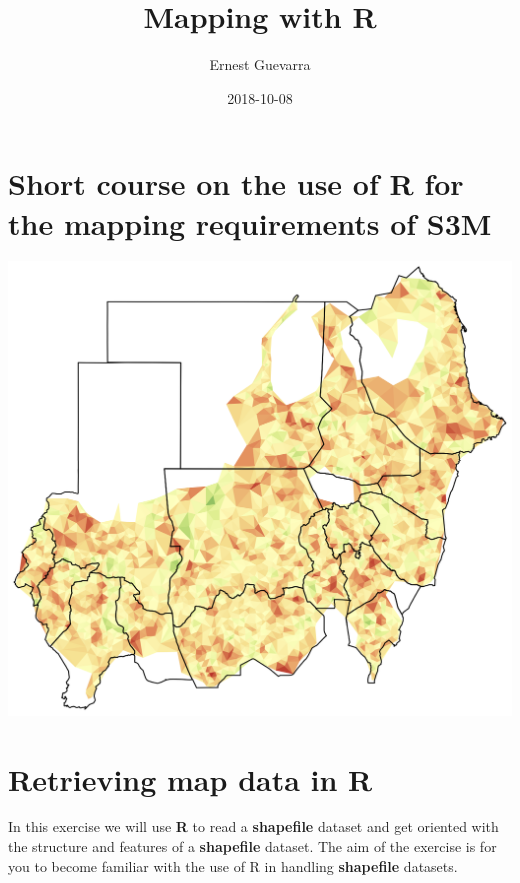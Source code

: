 \documentclass[12pt,a4paper,a4paper]{book}
\title{Mapping with R}
\author{Ernest Guevarra}
\date{2018-10-08}
\theoremstyle{definition}
\theoremstyle{definition}
\theoremstyle{definition}
\theoremstyle{remark}
\begin{document}
\maketitle

{
\hypersetup{linkcolor=black}
\setcounter{tocdepth}{1}
\tableofcontents
}
\listoftables
\listoffigures
\hypertarget{short-course-on-the-use-of-r-for-the-mapping-requirements-of-s3m}{%
\chapter*{Short course on the use of R for the mapping requirements of
S3M}\label{short-course-on-the-use-of-r-for-the-mapping-requirements-of-s3m}}

\begin{center}\includegraphics[width=18.75in]{figures/sudanMapTriSim} \end{center}

\hypertarget{exercise1}{%
\chapter{Retrieving map data in R}\label{exercise1}}

In this exercise we will use \textbf{R} to read a \textbf{shapefile}
dataset and get oriented with the structure and features of a
\textbf{shapefile} dataset. The aim of the exercise is for you to become
familiar with the use of R in handling \textbf{shapefile} datasets.
\end{document}
